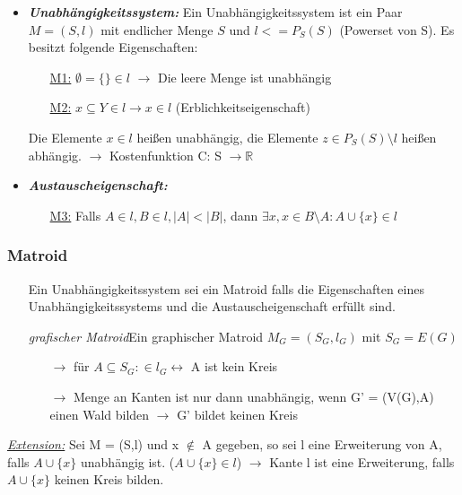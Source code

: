 \begin{itemize}
	\item \textbf{\textit{Unabhängigkeitssystem:}} \newline Ein Unabhängigkeitssystem ist ein Paar $M = (S,l)$ mit endlicher Menge $S$ und $l <= P_S(S)$ (Powerset von S). Es besitzt folgende Eigenschaften:
	\begin{itemize}
		\item[\underline{M1:}] $\emptyset = \{\} \in l$ $\rightarrow$ Die leere Menge ist unabhängig
		\item[\underline{M2:}] $x \subseteq Y \in l \rightarrow x \in l$ (Erblichkeitseigenschaft)
	\end{itemize}
	Die Elemente $x \in l$ heißen unabhängig, die Elemente $z \in P_S(S) \setminus l$ heißen abhängig. \newline
	$\rightarrow$ Kostenfunktion C: S $\rightarrow \mathbb{R}$ 
	\item \textbf{\textit{Austauscheigenschaft:}}
	\begin{itemize}
		\item [\underline{M3:}] Falls $A \in l, B \in l, |A| < |B|$, dann $\exists x, x \in B \setminus A: A \cup \{x\} \in l$
	\end{itemize}
\end{itemize}

\subsubsection{Matroid}
\begin{itemize}
	\item[] Ein Unabhängigkeitssystem sei ein Matroid falls die Eigenschaften eines Unabhängigkeitssystems und die Austauscheigenschaft erfüllt sind.
	\item[] \textit{grafischer Matroid}\newline Ein graphischer Matroid $M_G = (S_G,l_G)$ mit $S_G = E(G)$
	\begin{itemize}
		\item[$\rightarrow$] für $A \subseteq S_G: \in l_G \leftrightarrow$ A ist kein Kreis
		\item[$\rightarrow$] Menge an Kanten ist nur dann unabhängig, wenn G' = (V(G),A) einen Wald bilden $\rightarrow$ G' bildet keinen Kreis
	\end{itemize}
\end{itemize}

\underline{\textit{Extension:}} \newline Sei M = (S,l) und x $\notin$ A gegeben, so sei l eine Erweiterung von A, falls $A \cup \{x\}$ unabhängig ist. ($A \cup \{x\}\in l$) \newline  $\rightarrow$ Kante l ist eine Erweiterung, falls $A \cup \{x\}$ keinen Kreis bilden. \newline 

